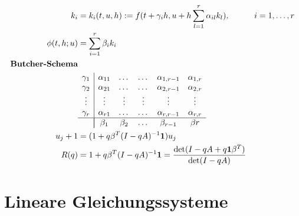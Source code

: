 \documentclass[
	ngerman,
	accentcolor=9c,%
	type=intern,
	marginpar=false
	]{tudapub}
\begin{document}
            \begin{align*}
                k_i &= k_i(t,u,h) := f(t + \gamma_i h, u+h \sum_{l=1}^r\alpha_{il} k_l), & i&= 1, \dots,r\\
                \phi(t,h;u) &= \sum_{i=1}^r \beta_i k_i \\
                \textbf{Butcher-Schema}& \\
                &
                \begin{array} {c | c c c c c}
                    \gamma_1 &  \alpha_{11} & \dots & \dots & \alpha_{1,r-1} & \alpha_{1,r}\\
                    \gamma_2 &  \alpha_{21} & \dots & \dots & \alpha_{2,r-1} & \alpha_{2,r}\\
                    \vdots   &  \vdots & \vdots & \vdots &\vdots & \vdots\\
                    \gamma_r &  \alpha_{r1} & \dots & \dots & \alpha_{r,r-1} & \alpha_{r,r}\\
                    \hline\\[-\normalbaselineskip]
                    & \beta_1 & \beta_2 & \dots & \beta_{r-1} & \beta{r}
                \end{array}\\
                u_j+1 &= (1+ q\beta^T (I - qA)^{-1}\mathbf{1})u_j\\
                R(q) &= 1 + q\beta^T(I-qA)^{-1}\mathbf{1}= \dfrac{\det(I-qA+q\mathbf{1}\beta^T)}{\det(I-qA)}
            \end{align*}
            \newpage
    \section{Lineare Gleichungssysteme}
\end{document}
